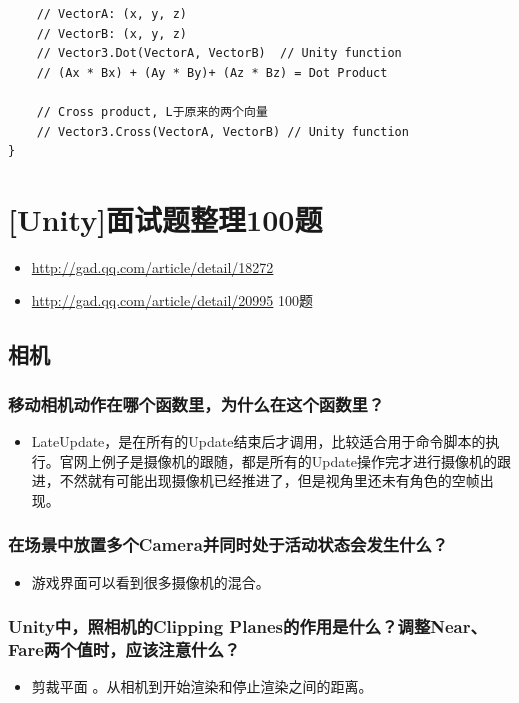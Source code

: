 \documentclass[9pt, b5paper]{article}
\begin{document}
\begin{verbatim}
    // VectorA: (x, y, z)
    // VectorB: (x, y, z)
    // Vector3.Dot(VectorA, VectorB)  // Unity function
    // (Ax * Bx) + (Ay * By)+ (Az * Bz) = Dot Product

    // Cross product, L于原来的两个向量
    // Vector3.Cross(VectorA, VectorB) // Unity function
}
\end{verbatim}
\section{[Unity]面试题整理100题}
\label{sec:org86a3d25}
\begin{itemize}
\item \url{http://gad.qq.com/article/detail/18272}
\item \url{http://gad.qq.com/article/detail/20995} 100题
\end{itemize}
\subsection{相机}
\label{sec:org3094c48}
\subsubsection{移动相机动作在哪个函数里，为什么在这个函数里？}
\label{sec:org46a9dd6}
\begin{itemize}
\item LateUpdate，是在所有的Update结束后才调用，比较适合用于命令脚本的执行。官网上例子是摄像机的跟随，都是所有的Update操作完才进行摄像机的跟进，不然就有可能出现摄像机已经推进了，但是视角里还未有角色的空帧出现。
\end{itemize}
\subsubsection{在场景中放置多个Camera并同时处于活动状态会发生什么？}
\label{sec:org1c2d53c}
\begin{itemize}
\item 游戏界面可以看到很多摄像机的混合。
\end{itemize}
\subsubsection{Unity中，照相机的Clipping Planes的作用是什么？调整Near、Fare两个值时，应该注意什么？}
\label{sec:org462a68c}
\begin{itemize}
\item 剪裁平面 。从相机到开始渲染和停止渲染之间的距离。
\end{itemize}
\end{document}
